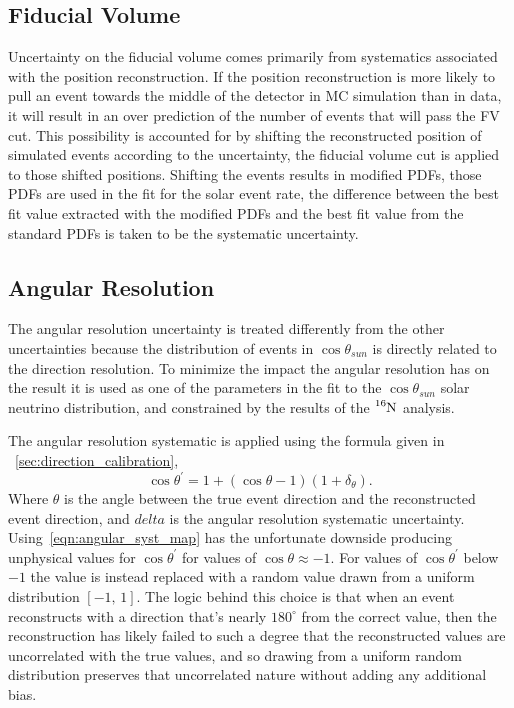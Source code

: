 \subsection{Fiducial Volume}
Uncertainty on the fiducial volume comes primarily from systematics associated
with the position reconstruction.
If the position reconstruction is more likely to pull an event towards the
middle of the detector
in MC simulation than in data, it will result in an over prediction of the
number of events that will pass the FV cut.
This possibility is accounted for by shifting the reconstructed position of
simulated events according to the uncertainty, the fiducial volume cut is
applied to those shifted positions.  Shifting the events results in modified
PDFs, those PDFs are used in the fit for the solar event rate, the difference
between the best fit value extracted with the modified PDFs and the best fit
value from the standard PDFs is taken to be the systematic uncertainty.
\subsection{Angular Resolution}
\label{sec:angular_systematics}
The angular resolution uncertainty is treated differently from the other
uncertainties because the distribution of events in $\cos\theta_{sun}$ is
directly related to the direction resolution.  To minimize the impact the
angular resolution has on the result it is used as one of the parameters in the
fit to the $\cos\theta_{sun}$ solar neutrino distribution, and constrained by
the results of the $\ce{^{16}N}$ analysis.

The angular resolution systematic is applied using the formula given in
~\ref{sec:direction_calibration},
\begin{equation}
    \cos\theta^{\prime} = 1 + (\cos\theta - 1)(1+\delta_{\theta})\text{.}
    \label{eqn:angular_syst_map}
\end{equation}
Where $\theta$ is the angle between the true event direction and the reconstructed
event direction, and $delta$ is the angular resolution systematic uncertainty.
Using~\eqref{eqn:angular_syst_map} has the unfortunate downside producing
unphysical values for $\cos\theta^{\prime}$ for values of $\cos\theta\approx-1$.
For values of $\cos\theta^{\prime}$ below $-1$ the value is instead replaced
with a random value drawn from a uniform distribution $\left[-1\text{, }1\right]$.
The logic behind this choice is that when an event reconstructs with a direction
that's nearly $180^{\circ}$ from the correct value, then the reconstruction
has likely failed to such a degree that the reconstructed values are uncorrelated
with the true values, and so drawing from a uniform random distribution preserves
that uncorrelated nature without adding any additional bias.

